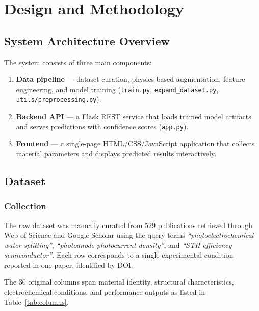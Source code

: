 \chapter{Design and Methodology}\label{ch:B}

\section{System Architecture Overview}

The system consists of three main components:

\begin{enumerate}
  \item \textbf{Data pipeline} — dataset curation, physics-based augmentation,
        feature engineering, and model training (\texttt{train.py},
        \texttt{expand\_dataset.py}, \texttt{utils/preprocessing.py}).
  \item \textbf{Backend API} — a Flask REST service that loads trained model
        artifacts and serves predictions with confidence scores
        (\texttt{app.py}).
  \item \textbf{Frontend} — a single-page HTML/CSS/JavaScript application
        that collects material parameters and displays predicted results
        interactively.
\end{enumerate}

\section{Dataset}

\subsection{Collection}

The raw dataset was manually curated from 529 publications retrieved through
Web of Science and Google Scholar using the query terms
\emph{``photoelectrochemical water splitting''},
\emph{``photoanode photocurrent density''}, and
\emph{``STH efficiency semiconductor''}.
Each row corresponds to a single experimental condition reported in one paper,
identified by DOI.

The 30 original columns span material identity, structural characteristics,
electrochemical conditions, and performance outputs as listed in
Table~\ref{tab:columns}.

